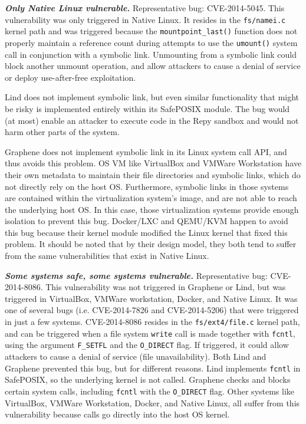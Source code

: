 {{\emph{\textbf{Only Native Linux vulnerable.}}  Representative bug: CVE-2014-5045.
This vulnerability was only triggered in Native Linux. It resides in the
\texttt{fs/namei.c} kernel path and was triggered because
the \texttt{mountpoint\_last()}
function does not properly
maintain a reference count during attempts to use the \texttt{umount()} system call
in conjunction with a symbolic link. Unmounting from a symbolic link could block
another unmount operation, and allow attackers to cause a denial of service or
deploy use-after-free exploitation.

Lind does not implement symbolic link, but
even similar functionality that might be risky is implemented entirely
within its SafePOSIX module.  The bug would (at most) enable an attacker to execute
code in the Repy sandbox and would not harm other parts of the system.

Graphene does not implement symbolic link in its Linux system call API, and thus avoids
this problem.
OS VM like VirtualBox and VMWare Workstation have their own metadata to maintain their file
directories and symbolic links, which do not directly rely on the host OS.
Furthermore, symbolic links in those systems are contained within the virtualization system's image,
and are not able to reach the underlying host OS. In this case, those virtualization systems provide enough
isolation to prevent this bug.
Docker/LXC and QEMU/KVM happen to avoid this bug because their kernel module modified the Linux kernel
that fixed this problem. It should be noted that by their design model, they both tend to suffer from
the same vulnerabilities that exist in Native Linux.

\emph{\textbf{Some systems safe, some systems vulnerable.}}  Representative bug: CVE-2014-8086.
This vulnerability was not triggered in Graphene or Lind, but was triggered in
VirtualBox, VMWare workstation, Docker, and Native Linux. It was one of several
bugs (i.e. CVE-2014-7826 and CVE-2014-5206) that were triggered in just a few systems.
CVE-2014-8086 resides in the \texttt{fs/ext4/file.c} kernel path,  and can be
triggered when a file system \texttt{write}
call is made together with \texttt{fcntl},
using the argument \texttt{F\_SETFL} and the \texttt{O\_DIRECT} flag. If triggered, it could
allow attackers to cause a denial of service (file unavailability). Both Lind and
Graphene prevented this bug, but for different reasons. Lind
implements \texttt{fcntl} in SafePOSIX, so the underlying kernel is not called.
Graphene checks and blocks certain system calls, including
\texttt{fcntl} with the \texttt{O\_DIRECT} flag.
Other systems like VirtualBox, VMWare Workstation, Docker, and Native Linux,
all suffer from this vulnerability because calls go directly into the host OS
kernel.

}}
